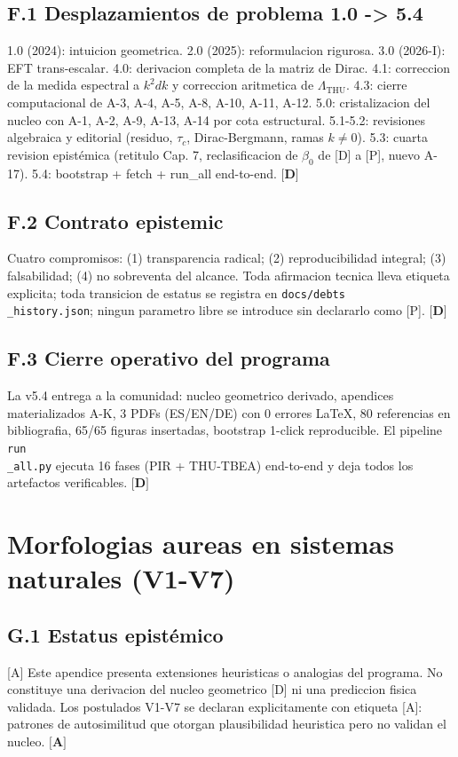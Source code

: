 ﻿\documentclass[11pt,letterpaper]{article}
\begin{document}
\subsection{F.1 Desplazamientos de problema 1.0 -> 5.4}
1.0 (2024): intuicion geometrica. 2.0 (2025): reformulacion rigurosa. 3.0 (2026-I): EFT trans-escalar. 4.0: derivacion completa de la matriz de Dirac. 4.1: correccion de la medida espectral a $k^2 dk$ y correccion aritmetica de $\Lambda_{\mathrm{THU}}$. 4.3: cierre computacional de A-3, A-4, A-5, A-8, A-10, A-11, A-12. 5.0: cristalizacion del nucleo con A-1, A-2, A-9, A-13, A-14 por cota estructural. 5.1-5.2: revisiones algebraica y editorial (residuo, $\tau_c$, Dirac-Bergmann, ramas $k \neq 0$). 5.3: cuarta revision epistémica (retitulo Cap. 7, reclasificacion de $\beta_0$ de [D] a [P], nuevo A-17). 5.4: bootstrap + fetch + run\_all end-to-end. $\textbf{[D]}$
\subsection{F.2 Contrato epistemic}
Cuatro compromisos: (1) transparencia radical; (2) reproducibilidad integral; (3) falsabilidad; (4) no sobreventa del alcance. Toda afirmacion tecnica lleva etiqueta explicita; toda transicion de estatus se registra en \texttt{docs/debts\\\_history.json}; ningun parametro libre se introduce sin declararlo como [P]. $\textbf{[D]}$
\subsection{F.3 Cierre operativo del programa}
La v5.4 entrega a la comunidad: nucleo geometrico derivado, apendices materializados A-K, 3 PDFs (ES/EN/DE) con 0 errores LaTeX, 80 referencias en bibliografia, 65/65 figuras insertadas, bootstrap 1-click reproducible. El pipeline \texttt{run\\\_all.py} ejecuta 16 fases (PIR + THU-TBEA) end-to-end y deja todos los artefactos verificables. $\textbf{[D]}$
\section{Morfologias aureas en sistemas naturales (V1-V7)}
\subsection{G.1 Estatus epistémico}
[A] Este apendice presenta extensiones heuristicas o analogias del programa. No constituye una derivacion del nucleo geometrico [D] ni una prediccion fisica validada. Los postulados V1-V7 se declaran explicitamente con etiqueta [A]: patrones de autosimilitud que otorgan plausibilidad heuristica pero no validan el nucleo. $\textbf{[A]}$
\end{document}
